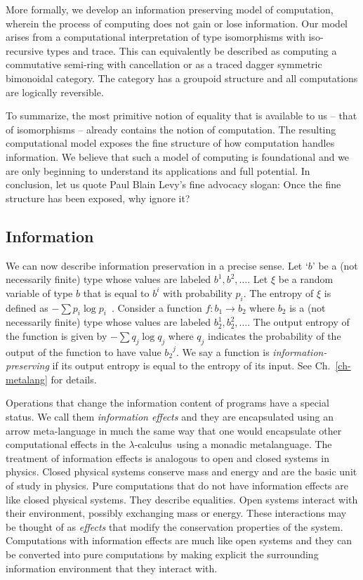 \documentclass{article}
\newcommand{\lcal}{\ensuremath{\lambda}-calculus}
\begin{document}
More formally, we develop an information preserving model of
computation, wherein the process of computing does not gain or lose
information. Our model arises from a computational interpretation of
type isomorphisms with iso-recursive types and trace. This can
equivalently be described as computing a commutative semi-ring with
cancellation or as a traced dagger symmetric bimonoidal category. The
category has a groupoid structure and all computations are logically
reversible. 

To summarize, the most primitive notion of equality that is available
to us -- that of isomorphisms -- already contains the notion of
computation. The resulting computational model exposes the fine
structure of how computation handles information. We believe that such
a model of computing is foundational and we are only beginning to
understand its applications and full potential. In conclusion, let us
quote Paul Blain Levy's fine advocacy slogan: Once the fine structure
has been exposed, why ignore it?

\subsection{Information}

We can now describe information preservation in a precise sense.  Let
`$b$' be a (not necessarily finite) type whose values are labeled
$b^1, b^2, \ldots$. Let $\xi$ be a random variable of type $b$ that is
equal to $b^i$ with probability $p_i$. The entropy of $\xi$ is defined
as $-\sum p_i \log{p_i}$~\cite{Shannon1948}.  Consider a function
$f : b_1 \rightarrow b_2$ where $b_2$ is a (not necessarily finite)
type whose values are labeled $b_2^1, b_2^2, \ldots$. The output
entropy of the function is given by $- \sum q_j \log{q_j}$ where $q_j$
indicates the probability of the output of the function to have value
${b_2}^j$. We say a function is \emph{information-preserving} if its
output entropy is equal to the entropy of its input. See
Ch.~\ref{ch-metalang} for details.

Operations that change the information content of programs have a
special status. We call them \emph{information effects} and they are
encapsulated using an arrow meta-language in much the same way that
one would encapsulate other computational effects in the \lcal\ using a
monadic metalanguage.  The treatment of information effects is
analogous to open and closed systems in physics. Closed physical
systems conserve mass and energy and are the basic unit of study in
physics. Pure computations that do not have information effects are
like closed physical systems. They describe equalities.  Open systems
interact with their environment, possibly exchanging mass or
energy. These interactions may be thought of as \emph{effects} that
modify the conservation properties of the system. Computations with
information effects are much like open systems and they can be
converted into pure computations by making explicit the surrounding
information environment that they interact with. 
\end{document}
